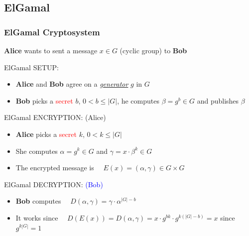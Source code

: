 \documentclass[10pt,handout]{beamer} %
\theoremstyle{definition}
\begin{document}
\subsection{ElGamal}
\begin{frame}
\frametitle{ElGamal Cryptosystem }

\textbf{Alice} wants to sent a message $x\in G$ (cyclic group) to \textbf{Bob}

\begin{beamerboxesrounded}[upper=block title example,lower=block body alerted,shadow=true]{ElGamal SETUP:}
 \begin{itemize}
\item[\textcolor{blue}{\ding{182}}] \textbf{Alice} and \textbf{Bob} agree on a \textit{\underline{generator}} $g$ in $G$
\item[\textcolor{blue}{\ding{183}}] \textbf{Bob} picks a \textcolor{red}{secret} $b$, $0< b\leq |G|$, he computes $\beta=g^b\in G$ and publishes $\beta$
\end{itemize}
\end{beamerboxesrounded}\bigskip

\begin{beamerboxesrounded}[upper=block title example,lower=block body alerted,shadow=true]{ElGamal ENCRYPTION: \alert{(Alice)}}
\begin{itemize}
\item[\textcolor{red}{\ding{172}}] \textbf{Alice} picks a \textcolor{red}{secret} $k$, $0< k\leq |G|$
\item[\textcolor{red}{\ding{173}}] She computes $\alpha=g^k\in G$ and $\gamma=x\cdot \beta^k\in G$
\item[\textcolor{red}{\ding{174}}] The encrypted message is $\quad E(x)=(\alpha,\gamma)\in G\times G$
\end{itemize}
\end{beamerboxesrounded}\bigskip


\begin{beamerboxesrounded}[upper=block title example,lower=block body alerted,shadow=true]{ElGamal DECRYPTION: \textcolor{blue}{(Bob)}}
\begin{itemize}
\item[\textcolor{blue}{\ding{172}}] \textbf{Bob} computes $\quad D(\alpha,\gamma)=\gamma\cdot\alpha^{|G|-b}$
\item[\textcolor{blue}{\ding{173}}] It works since $\quad D(E(x))=D(\alpha,\gamma)=x\cdot g^{bk}\cdot g^{k(|G|-b)}=x$ since $g^{k|G|} =1$
\end{itemize} 
\end{beamerboxesrounded}

\end{frame}
\end{document}
